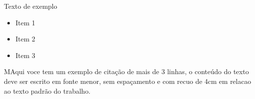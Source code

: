 Texto de exemplo

\begin{itemize}
	\item Item 1
	
	\item Item 2
	
	\item Item 3
	
\end{itemize}

\begin{citacao}
	MAqui voce tem um exemplo de citação de mais de 3 linhas, o conteúdo do texto deve ser escrito em fonte menor, sem espaçamento e com recuo de 4cm em relacao ao texto padrão do trabalho.
\end{citacao}
\fi